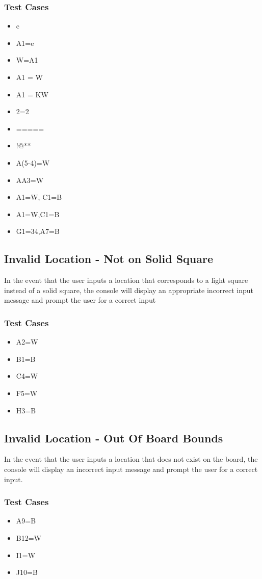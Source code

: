 \documentclass{article}
\begin{document}
\subsubsection{Test Cases}
\begin{itemize}
\item c
\item A1=e
\item W=A1
\item A1 = W
\item A1 = KW
\item 2=2
\item =====
\item !@**
\item A(5-4)=W
\item AA3=W
\item A1=W, C1=B
\item A1=W,\qquad C1=B
\item G1=34,A7=B
\end{itemize}

\subsection{Invalid Location - Not on Solid Square}
In the event that the user inputs a location that corresponds to a light square instead of a solid square, the console will display an appropriate incorrect input message and prompt the user for a correct input

\subsubsection{Test Cases}
\begin{itemize}
\item A2=W
\item B1=B
\item C4=W
\item F5=W
\item H3=B
\end{itemize}

\subsection{Invalid Location - Out Of Board Bounds}
In the event that the user inputs a location that does not exist on the board, the console will display an incorrect input message and prompt the user for a correct input.

\subsubsection{Test Cases}
\begin{itemize}
\item A9=B
\item B12=W
\item I1=W
\item J10=B
\end{itemize}
\end{document}
